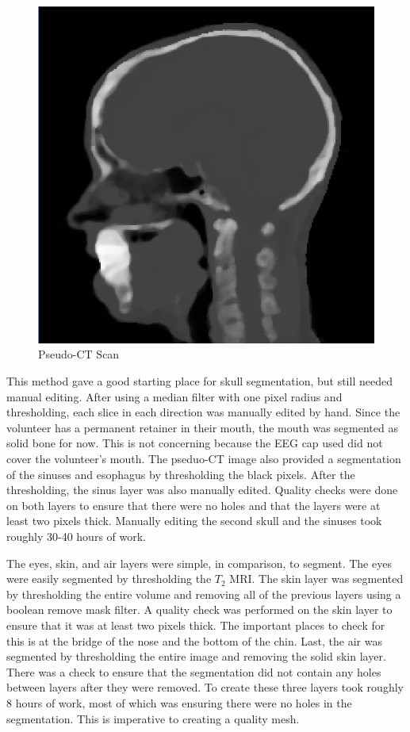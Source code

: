 \begin{figure}[H]
\begin{center}
\includegraphics[width=.75\textwidth]{Figures/pseudo_CT}
\caption{Pseudo-CT Scan}
\label{fig:ct}
\end{center}
\end{figure}

This method gave a good starting place for skull segmentation, but still needed manual editing. After using a median filter with one pixel radius and thresholding, each slice in each direction was manually edited by hand. Since the volunteer has a permanent retainer in their mouth, the mouth was segmented as solid bone for now. This is not concerning because the EEG cap used did not cover the volunteer's mouth. The pseduo-CT image also provided a segmentation of the sinuses and esophagus by thresholding the black pixels. After the thresholding, the sinus layer was also manually edited. Quality checks were done on both layers to ensure that there were no holes and that the layers were at least two pixels thick. Manually editing the second skull and the sinuses took roughly 30-40 hours of work. 

The eyes, skin, and air layers were simple, in comparison, to segment. The eyes were easily segmented by thresholding the $T_2$ MRI. The skin layer was segmented by thresholding the entire volume and removing all of the previous layers using a boolean remove mask filter. A quality check was performed on the skin layer to ensure that it was at least two pixels thick. The important places to check for this is at the bridge of the nose and the bottom of the chin. Last, the air was segmented by thresholding the entire image and removing the solid skin layer. There was a check to ensure that the segmentation did not contain any holes between layers after they were removed. To create these three layers took roughly 8 hours of work, most of which was ensuring there were no holes in the segmentation. This is imperative to creating a quality mesh.

